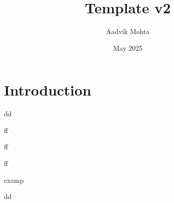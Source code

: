 \documentclass{article}
\title{Template v2}
\author{Aadvik Mohta}
\date{May 2025}
\theoremstyle{definition}
\renewenvironment{proof}[1][\proofname]{\vspace{-10pt}\begin{replacementproof}}{\end{replacementproof}}
\newenvironment{explanation}[1][]{\vspace{-10pt}\begin{tmpexplanation}}{\end{tmpexplanation}}
\begin{document}
\maketitle

\section{Introduction}
\begin{theorem}
    dd
\end{theorem}
\begin{note}
    ff
\end{note}
\begin{proof}
    ff
\end{proof}
\begin{definition}
    ff
\end{definition}
\begin{eg}
    examp
\end{eg}
\begin{explanation}
    dd
\end{explanation}
\end{document}
